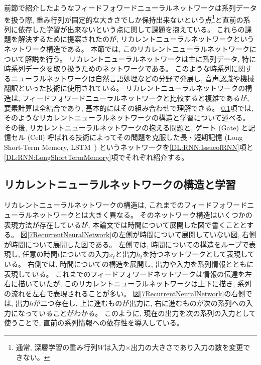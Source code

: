 前節で紹介したようなフィードフォワードニューラルネットワークは系列データを扱う際, 重み行列が固定的な大きさでしか保持出来ないという点\footnote{通常, 深層学習の重み行列$W$は入力$\times$出力の大きさであり入力の数を変更できない。}と直前の系列に依存した学習が出来ないという点に関して課題を抱えている。
これらの課題を解決するために提案されたのが, リカレントニューラルネットワークというネットワーク構造である。
本節では, このリカレントニューラルネットワークについて解説を行う。
リカレントニューラルネットワークは主に系列データ, 特に時系列データを取り扱うためのネットワークである。
このような時系列に関するニューラルネットワークは自然言語処理などの分野で発展し, 音声認識や機械翻訳といった技術に使用されている。
リカレントニューラルネットワークの構造は, フィードフォワードニューラルネットワークと比較すると複雑であるが, 要素計算は全結合であり, 基本的にはその組み合わせで理解できる。
\ref{DL:RNN:ReccurentNeuralNetwork}項では, そのようなリカレントニューラルネットワークの構造と学習について述べる。
その後, リカレントニューラルネットワークの抱える問題と, ゲート (Gate) と記憶セル (Cell) 呼ばれる技術によってその問題を克服した長・短期記憶 (Long Short-Term Memory, LSTM~\cite{LSTMpaper}) というネットワークを\ref{DL:RNN:IssueofRNN}項と\ref{DL:RNN:LongShortTermMemory}項でそれぞれ紹介する。


\subsection{リカレントニューラルネットワークの構造と学習} \label{DL:RNN:ReccurentNeuralNetwork}

リカレントニューラルネットワークの構造は, これまでのフィードフォワードニューラルネットワークとは大きく異なる。
そのネットワーク構造はいくつかの表現方法が存在しているが, 本論文では時間について展開した図で書くこととする。
図\ref{7RecurrentNeuralNetwork}の左側が時間について展開していない図, 右側が時間について展開した図である。
左側では, 時間についての構造をループで表現し, 任意の時間$t$についての入力$x_t$と出力$h_t$を持つネットワークとして表現している。
右側では, 時間についての構造を展開し, 出力や入力を系列情報とともに表現している。
これまでのフィードフォワードネットワークは情報の伝達を左右に描いていたが, このリカレントニューラルネットワークは上下に描き, 系列の流れを左右で表現されることが多い。
図\ref{7RecurrentNeuralNetwork}の右側では, 出力$h$が二つ存在し, 上に進むものが出力に, 右に進むものが次の系列への入力になっていることがわかる。
このように, 現在の出力を次の系列の入力として使うことで, 直前の系列情報への依存性を導入している。


